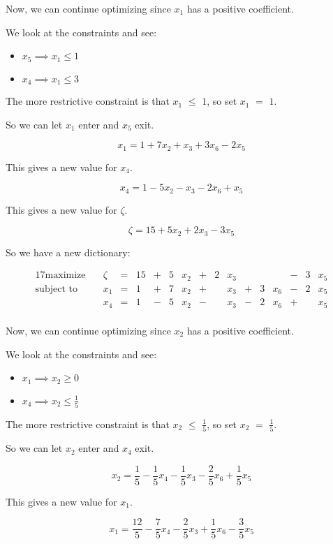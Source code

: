 \documentclass[12pt,letterpaper]{article}
\newcommand*\continueopt[1]{
  Now, we can continue optimizing since #1 has a positive coefficient.
}
\newcommand*\enterexit[2]{
  So we can let #1 enter and #2 exit.
}
\newcommand*\morerestrictive[2]{
  The more restrictive constraint is that #1 $\leq$ #2, so set #1 $=$ #2.
}
\newcommand*\newdict{
  So we have a new dictionary:
}
\newcommand*\newvalue[1]{
  This gives a new value for #1.
}
\begin{document}
\begin{enumerate}
      \continueopt{$x_1$}

      We look at the constraints and see:
      \begin{itemize}
        \item $x_5 \implies x_1 \leq 1$
        \item $x_4 \implies x_1 \leq 3$
      \end{itemize}

      \morerestrictive{$x_1$}{$1$}

      \enterexit{$x_1$}{$x_5$}

      \[
        x_1 = 1 + 7x_2 + x_3 + 3x_6 - 2x_5
      \]

      \newvalue{$x_4$}

      \[
        x_4 = 1 - 5x_2 - x_3 - 2x_6 + x_5
      \]

      \newvalue{$\zeta$}

      \[
        \zeta = 15 + 5x_2 + 2x_3 - 3x_5
      \]

      \newdict

      \begin{alignat*}{17}
        \text{maximize}   \quad & \zeta & {}={} & 15 & {}+{} & 5 & x_2 & {}+{} & 2 & x_3 &       &   &     & {}-{} & 3 & x_5 \\
        \text{subject to} \quad & x_1   & {}={} & 1  & {}+{} & 7 & x_2 & {}+{} &   & x_3 & {}+{} & 3 & x_6 & {}-{} & 2 & x_5 \\
                                & x_4   & {}={} & 1  & {}-{} & 5 & x_2 & {}-{} &   & x_3 & {}-{} & 2 & x_6 & {}+{} &   & x_5 \\
      \end{alignat*}

      \continueopt{$x_2$}

      We look at the constraints and see:
      \begin{itemize}
        \item $x_1 \implies x_2 \geq 0$
        \item $x_4 \implies x_2 \leq \frac{1}{5}$
      \end{itemize}

      \morerestrictive{$x_2$}{$\frac{1}{5}$}

      \enterexit{$x_2$}{$x_4$}

      \[
        x_2 = \frac{1}{5} - \frac{1}{5}x_4 - \frac{1}{5}x_3 - \frac{2}{5}x_6 + \frac{1}{5}x_5
      \]

      \newvalue{$x_1$}

      \[
        x_1 = \frac{12}{5} - \frac{7}{5}x_4 - \frac{2}{5}x_3 + \frac{1}{5}x_6 - \frac{3}{5}x_5
      \]


\end{enumerate}
\end{document}
